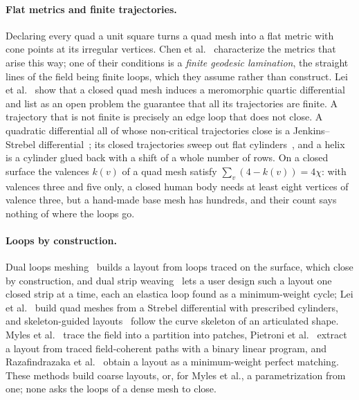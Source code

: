 \documentclass[11pt,a4paper]{article}
\begin{document}
\paragraph{Flat metrics and finite trajectories.}
Declaring every quad a unit square turns a quad mesh into a flat metric with
cone points at its irregular vertices. Chen et al.~\cite{chen2019metric}
characterize the metrics that arise this way; one of their conditions is a
\emph{finite geodesic lamination}, the straight lines of the field being
finite loops, which they assume rather than construct. Lei et
al.~\cite{lei2020quartic} show that a closed quad mesh induces a meromorphic
quartic differential and list as an open problem the guarantee that all its
trajectories are finite. A trajectory that is not finite is precisely an edge
loop that does not close. A quadratic differential all of whose non-critical
trajectories close is a Jenkins--Strebel
differential~\cite[\S20.1]{strebel1984quadratic}; its closed trajectories
sweep out flat cylinders~\cite[\S\S9.3, 20.2]{strebel1984quadratic}, and a helix is a cylinder glued back with
a shift of a whole number of rows. On a closed surface the valences $k(v)$ of
a quad mesh satisfy $\sum_v (4 - k(v)) = 4\chi$: with valences three and five only, a
closed human body needs at least eight vertices of valence three, but a hand-made base mesh has
hundreds, and their count says nothing of where the loops go.

\paragraph{Loops by construction.}
Dual loops meshing~\cite{campen2012dual} builds a layout from loops traced on
the surface, which close by construction, and dual strip
weaving~\cite{campen2014weaving} lets a user design such a layout one closed
strip at a time, each an elastica loop found as a minimum-weight cycle; Lei et
al.~\cite{lei2017foliation} build quad meshes from a Strebel differential
with prescribed cylinders, and skeleton-guided
layouts~\cite{usai2015skeleton} follow the curve skeleton of an articulated
shape. Myles
et al.~\cite{myles2014robust} trace the field into a partition into patches,
Pietroni et al.~\cite{pietroni2016tracing} extract a layout from traced
field-coherent paths with a binary linear program, and Razafindrazaka et
al.~\cite{razafindrazaka2015perfect} obtain a layout as a minimum-weight
perfect matching. These methods build coarse layouts, or, for Myles et al.,
a parametrization from one; none asks the loops of a dense mesh to close.
\end{document}
